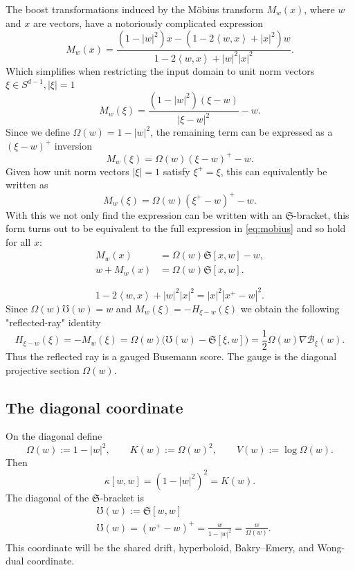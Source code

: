 \documentclass[11pt]{article}
\newcommand{\Sph}{{S}}
\newcommand{\ip}[2]{\left\langle #1,#2\right\rangle}
\newcommand{\norm}[1]{\left|#1\right|}
\newcommand{\grad}{\nabla}
\newcommand{\Hh}{ H}
\newcommand{\UU}{\mho}
\newcommand{\Mob}{M}
\newcommand{\Sbr}[2]{\mathfrak S[#1,#2]}
\newcommand{\kap}[2]{\kappa[#1,#2]}
\newcommand{\Om}{\Omega}
\newcommand{\calB}{\mathcal B}
\begin{document}
The boost transformations induced by the Möbius transform $\Mob_w(x)$, where $w$ and $x$ are vectors, have a notoriously complicated expression
\begin{equation}
M_w(x)
=
\frac{(1-|w|^2)x-(1-2\ip{w}{x}+|x|^2)w}
{1-2\ip{w}{x}+|w|^2|x|^2}.
\label{eq:mobius}
\end{equation}
Which simplifies when restricting the input domain to unit norm vectors $\xi\in \Sph^{d-1}, |\xi|=1$
\[
    \Mob_w(\xi)=\frac{(1-|w|^2)(\xi-w)}{|\xi-w|^2} -w.
\]
Since we define $\Om(w)=1-|w|^2$, the remaining term can be expressed as a $(\xi-w)^+$ inversion
\[
    \Mob_w(\xi)=\Om(w)(\xi-w)^+-w.
\]
Given how unit norm vectors $|\xi|=1$ satisfy $\xi^+= \xi$, this can equivalently be written as
\[
    \Mob_w(\xi)=\Om(w)(\xi^+-w)^+-w.
\]
With this we not only find the expression can be written with an $\mathfrak{S}$-bracket, this form turns out to be equivalent to the full expression in \eqref{eq:mobius} and so hold for all $x$:
\[
    \boxed{
    \begin{aligned}
    \Mob_w(x)&=\Om(w)\Sbr{x}{w}-w,\\[6pt]
    w+\Mob_w(x)&=\Om(w)\Sbr{x}{w}.
    \end{aligned}
    }
\]

\begin{equation}
1-2\ip{w}{x}+|w|^2|x|^2
=|x|^2|x^+-w|^2.
\end{equation}
Since  $\Om(w)\UU(w)=w$ and $\Mob_w(\xi)=-\Hh_{\xi-w}(\xi)$ we obtain the following "reflected-ray" identity 
\[
    \boxed{
    \Hh_{\xi-w}(\xi)=-\Mob_w(\xi)=\Om(w)\bigl(\UU(w)-\Sbr{\xi}{w}\bigr)
    =\frac12\Om(w)\grad\calB_\xi(w).
    }
\]
Thus the reflected ray is a gauged Busemann score.  The gauge is the diagonal projective section $\Om(w)$.

\subsection{The diagonal coordinate}

On the diagonal define
\[
    \Om(w):=1-\norm w^2,
    \qquad
    K(w):=\Om(w)^2,
    \qquad
    V(w):=\log\Om(w).
\]
Then
\[
    \kap{w}{w}=(1-\norm w^2)^2=K(w).
\]
The diagonal of the $\mathfrak{S}$-bracket is
\[
    \boxed{
\begin{aligned}
    &\UU(w):=\Sbr{w}{w}\\[6pt]
    &\UU(w)=(w^+-w)^+=\frac{w}{1-\norm w^2}=\frac{w}{\Om(w)}.
\end{aligned}
    }
\]
This coordinate will be the shared drift, hyperboloid, Bakry--Emery, and Wong-dual coordinate.
\end{document}
